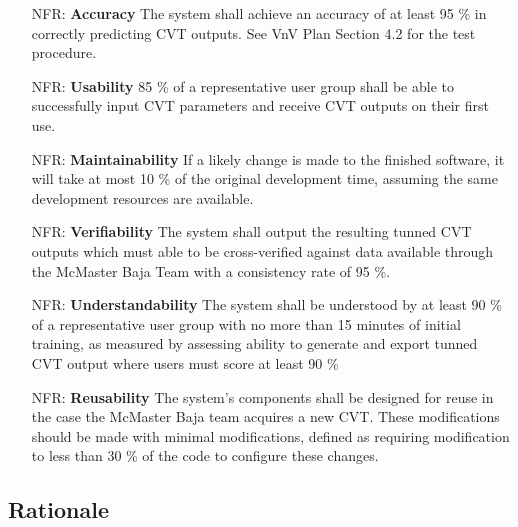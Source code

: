 \documentclass[12pt]{article}
\newcounter{nfrnum} %
\begin{document}
\noindent \begin{itemize}

\item[NFR\refstepcounter{nfrnum}\thenfrnum \label{NFR_Accuracy}:]\textbf{Accuracy} The system shall achieve an accuracy of at least 95 \% in correctly predicting CVT outputs. See VnV Plan Section 4.2 for the test procedure.
\item[NFR\refstepcounter{nfrnum}\thenfrnum \label{NFR_Usability}:] \textbf{Usability} 85 \% of a representative user group shall be able to successfully input CVT parameters and receive CVT outputs on their first use.
\item[NFR\refstepcounter{nfrnum}\thenfrnum \label{NFR_Maintainability}:]\textbf{Maintainability} If a likely change is made to the finished software, it will take at most 10 \% of the original development time, assuming the same development resources are available.
\item[NFR\refstepcounter{nfrnum}\thenfrnum \label{NFR_Verifiability}:] \textbf{Verifiability} The system shall output the resulting tunned CVT outputs which must able to be cross-verified against data available through the McMaster Baja Team with a consistency rate of 95 \%.
\item[NFR\refstepcounter{nfrnum}\thenfrnum \label{NFR_Understandability}:] \textbf{Understandability} The system shall be understood by at least 90 \% of a representative user group with no more than 15 minutes of initial training, as measured by assessing ability to generate and export tunned CVT output where users must score at least 90 \%
\item[NFR\refstepcounter{nfrnum}\thenfrnum \label{NFR_Reusability}:] \textbf{Reusability} The system's components shall be designed for reuse in the case the McMaster Baja team acquires a new CVT. These modifications should be made with minimal modifications, defined as requiring modification to less than 30 \% of the code to configure these changes.

\end{itemize}

\subsection{Rationale}
\end{document}
